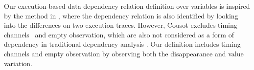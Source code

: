 {Our execution-based data dependency relation definition over variables 
is inspired by the method in \cite{Cousot19a}, where the dependency relation is also identified by looking into the differences on two execution traces. 
However, Cousot excludes timing channels~\cite{SabelfeldM03} and empty observation, which are also not considered as a form of dependency in traditional dependency analysis \cite{DenningD77}.
Our definition includes timing channels and empty observation by observing both the disappearance and value variation.
}
